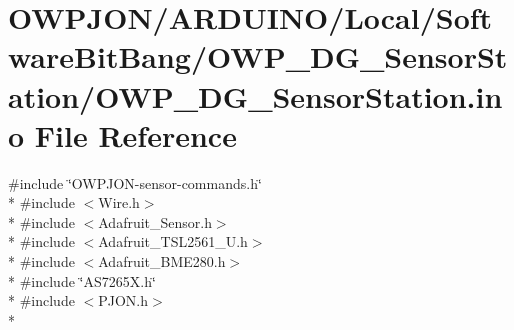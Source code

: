 \hypertarget{OWP__DG__SensorStation_8ino}{\section{O\-W\-P\-J\-O\-N/\-A\-R\-D\-U\-I\-N\-O/\-Local/\-Software\-Bit\-Bang/\-O\-W\-P\-\_\-\-D\-G\-\_\-\-Sensor\-Station/\-O\-W\-P\-\_\-\-D\-G\-\_\-\-Sensor\-Station.ino File Reference}
\label{OWP__DG__SensorStation_8ino}
}
{\ttfamily \#include \char`\"{}O\-W\-P\-J\-O\-N-\/sensor-\/commands.\-h\char`\"{}}\\*
{\ttfamily \#include $<$Wire.\-h$>$}\\*
{\ttfamily \#include $<$Adafruit\-\_\-\-Sensor.\-h$>$}\\*
{\ttfamily \#include $<$Adafruit\-\_\-\-T\-S\-L2561\-\_\-\-U.\-h$>$}\\*
{\ttfamily \#include $<$Adafruit\-\_\-\-B\-M\-E280.\-h$>$}\\*
{\ttfamily \#include \char`\"{}A\-S7265\-X.\-h\char`\"{}}\\*
{\ttfamily \#include $<$P\-J\-O\-N.\-h$>$}\\*
